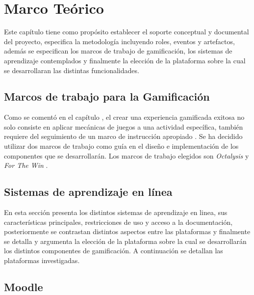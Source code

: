 \chapter{Marco Teórico}
\label{ch:marcoTeorico}

 Este capítulo tiene como propósito establecer el soporte conceptual y documental del proyecto,
 especifica la metodología incluyendo roles, eventos y artefactos, además se especifican los
 marcos de trabajo de gamificación, los sistemas de aprendizaje contemplados y finalmente
 la elección de la plataforma sobre la cual se desarrollaran las distintas funcionalidades.

    

\section{Marcos de trabajo para la Gamificación}

 Como se comentó en el capítulo , el crear una experiencia
 gamificada exitosa no solo consiste en aplicar mecánicas de juegos a una actividad
 específica, también requiere del seguimiento de un marco de instrucción apropiado \cite[p. 1110]{GamInE-Learning}.
 Se ha decidido utilizar dos marcos de trabajo como guía en el diseño e implementación
 de los componentes que se desarrollarán. Los marcos de trabajo elegidos son {\it Octalysis}
 \cite{Octalysis} y {\it For The Win} \cite{ForTheWin}.

    
    

\clearpage
\section{Sistemas de aprendizaje en línea}
\label{sec:sistemasaprendizaje}

 En esta sección presenta los distintos sistemas de aprendizaje en linea, sus características
 principales, restricciones de uso y acceso a la documentación, posteriormente se contrastan
 distintos aspectos entre las plataformas y finalmente se detalla y argumenta la elección de
 la plataforma sobre la cual se desarrollarán los distintos componentes de gamificación.
 A continuación se detallan las plataformas investigadas.

    

\clearpage
\section{Moodle}

